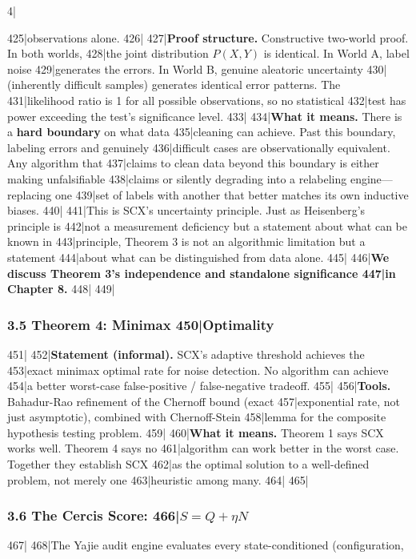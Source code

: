 4|\documentclass[
5|  12pt,
6|]{ctexart}
\begin{document}
425|observations alone.
426|
427|\textbf{Proof structure.} Constructive two-world proof. In both worlds,
428|the joint distribution \(P(X, Y)\) is identical. In World A, label noise
429|generates the errors. In World B, genuine aleatoric uncertainty
430|(inherently difficult samples) generates identical error patterns. The
431|likelihood ratio is 1 for all possible observations, so no statistical
432|test has power exceeding the test's significance level.
433|
434|\textbf{What it means.} There is a \textbf{hard boundary} on what data
435|cleaning can achieve. Past this boundary, labeling errors and genuinely
436|difficult cases are observationally equivalent. Any algorithm that
437|claims to clean data beyond this boundary is either making unfalsifiable
438|claims or silently degrading into a relabeling engine---replacing one
439|set of labels with another that better matches its own inductive biases.
440|
441|This is SCX's uncertainty principle. Just as Heisenberg's principle is
442|not a measurement deficiency but a statement about what can be known in
443|principle, Theorem 3 is not an algorithmic limitation but a statement
444|about what can be distinguished from data alone.
445|
446|\textbf{We discuss Theorem 3's independence and standalone significance
447|in Chapter 8.}
448|
449|\subsubsection{3.5 Theorem 4: Minimax
450|Optimality}\label{theorem-4-minimax-optimality}
451|
452|\textbf{Statement (informal).} SCX's adaptive threshold achieves the
453|exact minimax optimal rate for noise detection. No algorithm can achieve
454|a better worst-case false-positive / false-negative tradeoff.
455|
456|\textbf{Tools.} Bahadur-Rao refinement of the Chernoff bound (exact
457|exponential rate, not just asymptotic), combined with Chernoff-Stein
458|lemma for the composite hypothesis testing problem.
459|
460|\textbf{What it means.} Theorem 1 says SCX works well. Theorem 4 says no
461|algorithm can work better in the worst case. Together they establish SCX
462|as the optimal solution to a well-defined problem, not merely one
463|heuristic among many.
464|
465|\subsubsection{\texorpdfstring{3.6 The Cercis Score:
466|\(S = Q + \eta N\)}{3.6 The Cercis Score: S = Q + \textbackslash eta N}}\label{the-cercis-score-s-q-eta-n}
467|
468|The Yajie audit engine evaluates every state-conditioned (configuration,
\end{document}
